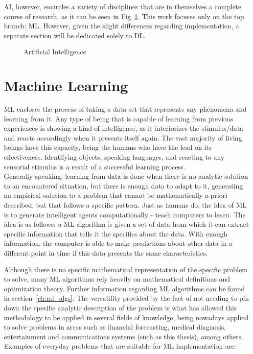 \ac{AI}, however, encircles a variety of disciplines that are in themselves a complete course of research, as it can be seen in Fig~\ref{fig:ai}. This work focuses only on the top branch: \ac{ML}. However, given the slight differences regarding implementation, a separate section will be dedicated solely to \ac{DL}.

\begin{figure}[htb]
    \centering
      
      \caption{Artificial Intelligence}
      \label{fig:ai}
\end{figure}

\section{Machine Learning}
\ac{ML} encloses the process of taking a data set that represents any phenomena and learning from it. Any type of being that is capable of learning from previous experiences is showing a kind of intelligence, as it interiorizes the stimulus/data and reacts accordingly when it presents itself again. The vast majority of living beings have this capacity, being the humans who have the lead on its effectiveness. Identifying objects, speaking languages, and reacting to any sensorial stimulus is a result of a successful learning process. \\

Generally speaking, learning from data is done when there is no analytic solution to an encountered situation, but there is enough data to adapt to it, generating an empirical solution to a problem that cannot be mathematically a-priori described, but that follows a specific pattern\cite{Yaser}. Just as humans do, the idea of \ac{ML} is to generate intelligent agents computationally - teach computers to learn. The idea is as follows: a \ac{ML} algorithm is given a set of data from which it can extract specific information that tells it the specifics about the data. With enough information, the computer is able to make predictions about other data in a different point in time if this data presents the same characteristics.

Although there is no specific mathematical representation of the specific problem to solve, many \ac{ML} algorithms rely heavily on mathematical definitions and optimization theory. Further information regarding \ac{ML} algorithms can be found in section~\ref{ch:ml_algs}. The versatility provided by the fact of not needing to pin down the specific analytic description of the problem is what has allowed this methodology to be applied in several fields of knowledge, being nowadays applied to solve problems in areas such as financial forecasting\cite{Bose2001}, medical diagnosis\cite{Kononenko2001}, entertainment\cite{Bennett2007} and communications systems (such as this thesis), among others. Examples of everyday problems that are suitable for \ac{ML} implementation are:

